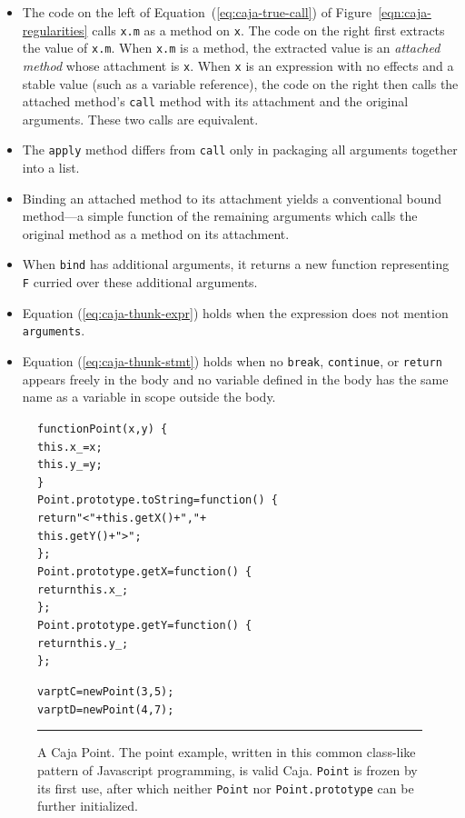 \documentclass[letterpaper,twocolumn,10pt]{article}
\newcommand{\code}[1]{{\tt {#1}}}              %
\begin{document}
\begin{itemize}

  \item The code on the left of Equation~(\ref{eq:caja-true-call}) of Figure~\ref{eqn:caja-regularities} calls
  \code{x.m} as a method on \code{x}. The code on the right first extracts the value of \code{x.m}. When \code{x.m} 
  is a method, the extracted value is an \emph{attached method} whose attachment is \code{x}. When \code{x} is an 
  expression with no effects and a stable value (such as a variable reference), the code on the right then calls the 
  attached method's \code{call} method with its attachment and the original arguments. These two calls are equivalent.
  
  \item The \code{apply} method differs from \code{call} only in packaging all arguments together into a list.
  
  \item Binding an attached method to its attachment yields a conventional bound method---a simple function of the 
  remaining arguments which calls the original method as a method on its attachment.
  
  \item When \code{bind} has additional arguments, it returns a new function representing \code{F} curried over these 
  additional arguments.
  
  \item Equation (\ref{eq:caja-thunk-expr}) holds when the expression does not mention \code{arguments}.

  \item Equation (\ref{eq:caja-thunk-stmt}) holds when no \code{break}, \code{continue}, or \code{return} appears
  freely in the body and no variable defined in the body has the same name as a variable in scope outside the body.

\end{itemize}


\begin{figure}[t!]
\begin{alltt}
function Point(x, y)\ \{
  this.x\_ = x;
  this.y\_ = y;
\}
Point.prototype.toString = function()\ \{ 
  return "<" + this.getX() + "," + 
               this.getY() + ">"; 
\};
Point.prototype.getX = function()\ \{ 
  return this.x\_; 
\};
Point.prototype.getY = function()\ \{ 
  return this.y\_;
\};

var ptC = new Point(3, 5);
var ptD = new Point(4, 7);
\end{alltt}

\caption[A Caja Point.]{A Caja Point. The point example, written in this common class-like pattern of Javascript 
programming, is valid Caja. \code{Point} is frozen by its first use, after which neither \code{Point} nor 
\code{Point.prototype} can be further initialized. \\ } \hrule
\label{fig:caja-point}
\end{figure}
\end{document}
